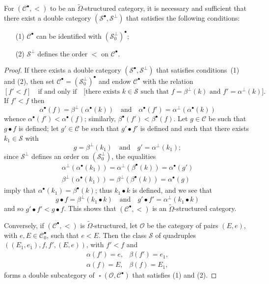 \documentclass[a4paper,fleqn]{article}
\theoremstyle{plain}
\newenvironment{proposition}[1]
  {\renewcommand\theinnerproposition{#1}\innerproposition}
  {\endinnerproposition}
\theoremstyle{definition}
\newcommand{\oldpage}[1]{{\marginpar{\footnotesize$\bigg\vert$\,\,\,\,\textit{p.~#1}}}}
\newcommand{\textand}{\quad\text{and}\quad}
\newcommand{\CC}{\mathcal{C}}
\renewcommand{\SS}{\mathcal{S}}
\DeclareMathOperator{\sq}{\square}
\newcommand{\smallbullet}{\bullet}
\begin{document}
\begin{proposition}{17}
\label{proposition:ii-17}
  For $(\CC^\smallbullet,<)$ to be an $\widetilde{\Omega}$-structured category, it is necessary and sufficient that there exist a double category $(\SS^\smallbullet,\SS^\perp)$ that satisfies the following conditions:
  \oldpage{401}
  \begin{enumerate}
    \item[\normalfont(1)]
      $\CC^\smallbullet$ can be identified with $(\SS_0^\perp)^\smallbullet$;
    \item[\normalfont(2)]
      $\SS^\perp$ defines the order $<$ on $\CC^\smallbullet$.
  \end{enumerate}
\end{proposition}

\begin{proof}
  If there exists a double category $(\SS^\smallbullet,\SS^\perp)$ that satisfies conditions~(1) and (2), then set $\CC^\smallbullet=(\SS_0^\perp)^\smallbullet$ and endow $\CC^\smallbullet$ with the relation
  \[
    [f' < f]
    \quad\text{if and only if}\quad
    \big[\text{there exists $k\in\SS$ such that $f=\beta^\perp(k)$ and $f'=\alpha^\perp(k)$}\big].
  \]
  If $f'<f$ then
  \[
    \alpha^\smallbullet(f) = \beta^\perp(\alpha^\smallbullet(k))
    \textand
    \alpha^\smallbullet(f') = \alpha^\perp(\alpha^\smallbullet(k))
  \]
  whence $\alpha^\smallbullet(f')<\alpha^\smallbullet(f)$;
  similarly, $\beta^\smallbullet(f')<\beta^\smallbullet(f)$.
  Let $g\in\CC$ be such that $g\smallbullet f$ is defined;
  let $g'\in\CC$ be such that $g'\smallbullet f'$ is defined and such that there exists $k_1\in\SS$ with
  \[
    g=\beta^\perp(k_1)
    \textand
    g'=\alpha^\perp(k_1);
  \]
  since $\SS^\perp$ defines an order on $(\SS_0^\perp)$, the equalities
  \[
    \begin{gathered}
      \alpha^\perp(\alpha^\smallbullet(k_1))
      = \alpha^\perp(\beta^\smallbullet(k))
      = \alpha^\smallbullet(g')
    \\\beta^\perp(\alpha^\smallbullet(k_1))
      = \beta^\perp(\beta^\smallbullet(k))
      = \alpha^\smallbullet(g)
    \end{gathered}
  \]
  imply that $\alpha^\smallbullet(k_1)=\beta^\smallbullet(k)$;
  thus $k_1\smallbullet k$ is defined, and we see that
  \[
    g\smallbullet f = \beta^\perp(k_1\smallbullet k)
    \textand
    g'\smallbullet f' = \alpha^\perp(k_1\smallbullet k)
  \]
  and so $g'\smallbullet f'<g\smallbullet f$.
  This shows that $(\CC^\smallbullet,<)$ is an $\widetilde{\Omega}$-structured category.

  Conversely, if $(\CC^\smallbullet,<)$ is $\widetilde{\Omega}$-structured, let $\mathcal{O}$ be the category of pairs $(E,e)$, with $e,E\in\CC_0^\smallbullet$, such that $e<E$.
  Then the class $\SS$ of quadruples $((E_1,e_1),f,f',(E,e))$, with $f'<f$ and
  \[
    \begin{array}{cc}
      \alpha(f')=e,
      & \beta(f')=e_1,
    \\\alpha(f)=E,
      &\beta(f)=E_1,
    \end{array}
  \]
  forms a double subcategory of $\sq(\mathcal{O},\CC^\smallbullet)$ that satisfies (1) and (2).
\end{proof}
\end{document}
